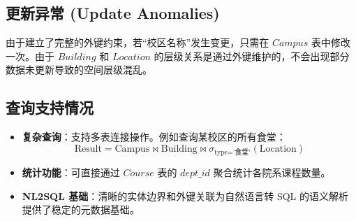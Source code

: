 \documentclass[11pt, a4paper]{article}
\begin{document}
\subsection{更新异常 (Update Anomalies)}
由于建立了完整的外键约束，若“校区名称”发生变更，只需在 $Campus$ 表中修改一次。由于 $Building$ 和 $Location$ 的层级关系是通过外键维护的，不会出现部分数据未更新导致的空间层级混乱。

\subsection{查询支持情况}
\begin{itemize}
    \item \textbf{复杂查询}：支持多表连接操作。例如查询某校区的所有食堂：
    \[ \text{Result} = \text{Campus} \bowtie \text{Building} \bowtie \sigma_{\text{type='食堂'}}(\text{Location}) \]
    \item \textbf{统计功能}：可直接通过 $Course$ 表的 $dept\_id$ 聚合统计各院系课程数量。
    \item \textbf{NL2SQL 基础}：清晰的实体边界和外键关联为自然语言转 SQL 的语义解析提供了稳定的元数据基础。
\end{itemize}
\end{document}
